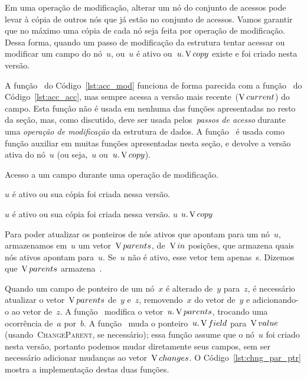 \documentclass[main.tex]{subfiles}
\begin{document}
Em uma operação de modificação, alterar um nó do conjunto de acessos pode levar à cópia de outros nós que já estão no conjunto de acessos. Vamos garantir que no máximo uma cópia de cada nó seja feita por operação de modificação. Dessa forma, quando um passo de modificação da estrutura tentar acessar ou modificar um campo do nó~$u$, ou~$u$ é ativo ou~$u.\operatorname{V}{copy}$ existe e foi criado nesta versão.

A função~ do Código~\ref{lst:acc_mod} funciona de forma parecida com a função~ do Código~\ref{lst:acc_acc}, mas sempre acessa a versão mais recente~($\operatorname{V}{current}$) do campo. Esta função não é usada em nenhuma das funções apresentadas no resto da seção, mas, como discutido, deve ser usada pelos~\emph{passos de acesso} durante uma \emph{operação de modificação} da estrutura de dados. A função~ é usada como função auxiliar em muitas funções apresentadas nesta seção, e devolve a versão ativa do nó~$u$ (ou seja,~$u$ ou~$u.\operatorname{V}{copy}$).

\begin{algorithm}
\caption{Acesso a um campo durante uma operação de modificação.} \label{lst:acc_mod}
\begin{algorithmic}[1]

\Require $u$ é ativo ou sua cópia foi criada nessa versão.
	\State \Return {}
\EndFunction

\Require $u$ é ativo ou sua cópia foi criada nessa versão.
		\State \Return $u$
	\Else
		\State \Return $u.\operatorname{V}{copy}$
	\EndIf
\EndFunction

\end{algorithmic}
\end{algorithm}

Para poder atualizar os ponteiros de nós ativos que apontam para um nó~$u$, armazenamos em~$u$ um vetor~$\operatorname{V}{parents}$, de~$\operatorname{V}{in}$ posições, que armazena quais nós ativos apontam para~$u$. Se~$u$ não é ativo, esse vetor tem apenas~s. Dizemos que~$\operatorname{V}{parents}$ armazena~.

Quando um campo de ponteiro de um nó~$x$ é alterado de~$y$ para~$z$, é necessário atualizar o vetor~$\operatorname{V}{parents}$ de~$y$ e~$z$, removendo~$x$ do vetor de~$y$ e adicionando-o ao vetor de~$z$. A função~\mbox{} modifica o vetor~$u.\operatorname{V}{parents}$, trocando uma ocorrência de~$a$ por~$b$. A função~\mbox{} muda o ponteiro~$u.\operatorname{V}{field}$ para~$\operatorname{V}{value}$ (usando~\textsc{ChangeParent}, se necessário); essa função assume que o nó~$u$ foi criado nesta versão, portanto podemos mudar diretamente seus campos, sem ser necessário adicionar mudanças ao vetor~$\operatorname{V}{changes}$. O Código~\ref{lst:chng_par_ptr} mostra a implementação destas duas funções.
\end{document}
